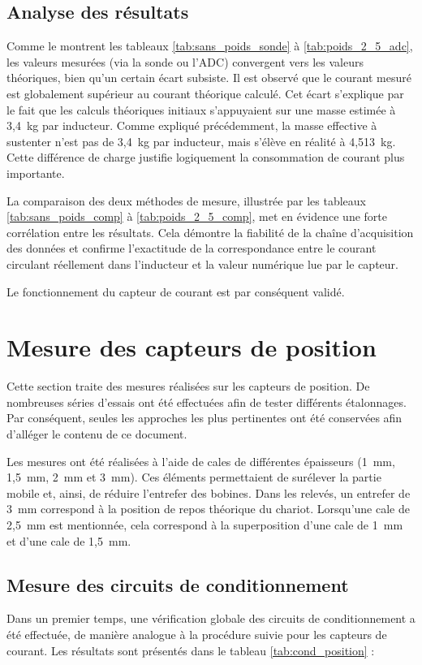 \subsection{Analyse des résultats}
Comme le montrent les tableaux \ref{tab:sans_poids_sonde} à \ref{tab:poids_2_5_adc}, les valeurs mesurées (via la sonde ou l'ADC) convergent vers les valeurs théoriques, bien qu'un certain écart subsiste. Il est observé que le courant mesuré est globalement supérieur au courant théorique calculé. Cet écart s'explique par le fait que les calculs théoriques initiaux s'appuyaient sur une masse estimée à 3,4~kg par inducteur. Comme expliqué précédemment, la masse effective à sustenter n'est pas de 3,4~kg par inducteur, mais s'élève en réalité à 4,513~kg. Cette différence de charge justifie logiquement la consommation de courant plus importante.

La comparaison des deux méthodes de mesure, illustrée par les tableaux \ref{tab:sans_poids_comp} à \ref{tab:poids_2_5_comp}, met en évidence une forte corrélation entre les résultats. Cela démontre la fiabilité de la chaîne d'acquisition des données et confirme l'exactitude de la correspondance entre le courant circulant réellement dans l'inducteur et la valeur numérique lue par le capteur.

Le fonctionnement du capteur de courant est par conséquent validé.

\section{Mesure des capteurs de position}
Cette section traite des mesures réalisées sur les capteurs de position. De nombreuses séries d'essais ont été effectuées afin de tester différents étalonnages. Par conséquent, seules les approches les plus pertinentes ont été conservées afin d'alléger le contenu de ce document.

Les mesures ont été réalisées à l'aide de cales de différentes épaisseurs (1~mm, 1,5~mm, 2~mm et 3~mm). Ces éléments permettaient de surélever la partie mobile et, ainsi, de réduire l'entrefer des bobines. Dans les relevés, un entrefer de 3~mm correspond à la position de repos théorique du chariot. Lorsqu'une cale de 2,5~mm est mentionnée, cela correspond à la superposition d'une cale de 1~mm et d'une cale de 1,5~mm.

\subsection{Mesure des circuits de conditionnement}
Dans un premier temps, une vérification globale des circuits de conditionnement a été effectuée, de manière analogue à la procédure suivie pour les capteurs de courant. Les résultats sont présentés dans le tableau \ref{tab:cond_position} :


